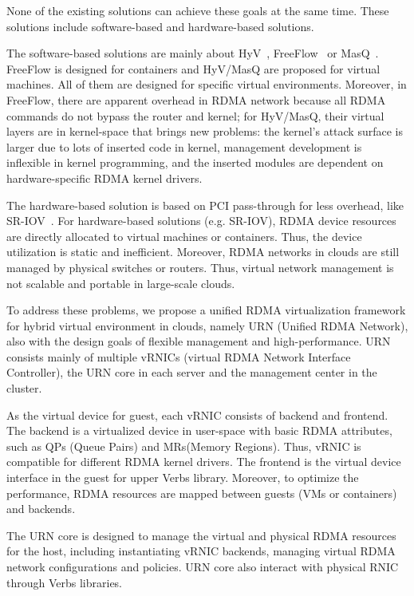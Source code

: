 None of the existing solutions can achieve these goals at the same time. These solutions include software-based and hardware-based solutions.

The software-based solutions are mainly about HyV~\cite{pfefferle2015hybrid}, FreeFlow~\cite{kim2019freeflow} or MasQ~\cite{he2020masq}. FreeFlow is  designed for containers and HyV/MasQ are proposed for virtual machines. All of them are designed for specific virtual environments. Moreover, in FreeFlow, there are apparent overhead in RDMA network because all RDMA commands do not bypass the router and kernel; for HyV/MasQ, their virtual layers are in kernel-space that brings new problems: the kernel's attack surface is larger due to lots of inserted code in kernel, management development is inflexible in kernel programming, and the inserted modules are dependent on hardware-specific RDMA kernel drivers.

The hardware-based solution is based on PCI pass-through for less overhead, like SR-IOV~\cite{sr-iov}. For hardware-based solutions (e.g. SR-IOV), RDMA device resources are directly allocated to virtual machines or containers. Thus, the device utilization is static and inefficient. Moreover, RDMA networks in clouds are still managed by physical switches or routers. Thus, virtual network management is not scalable and portable in large-scale clouds.

To address these problems, we propose a unified RDMA virtualization framework for hybrid virtual environment in clouds, namely URN (Unified RDMA Network), also with the design goals of flexible management and high-performance. URN consists mainly of multiple vRNICs (virtual RDMA Network Interface Controller), the URN core in each server and the management center in the cluster.

As the virtual device for guest, each vRNIC consists of backend and frontend. The backend is a virtualized device in user-space with basic RDMA attributes, such as QPs (Queue Pairs) and MRs(Memory Regions). Thus, vRNIC is compatible for different RDMA kernel drivers. The frontend is the virtual device interface in the guest for upper Verbs library. Moreover, to optimize the performance, RDMA resources are mapped between guests (VMs or containers) and backends. 

The URN core is designed to manage the virtual and physical RDMA resources for the host, including instantiating vRNIC backends, managing virtual RDMA network configurations and policies. URN core also interact with physical RNIC through Verbs libraries. 


